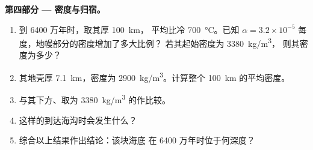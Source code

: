 \begin{problem}
\medskip
\noindent\textbf{第四部分 --- 密度与归宿。}
\begin{enumerate}[resume]
  \item 到 6400 万年时，取其厚 \qty{100}{km}，
        平均比冷 \qty{700}{\celsius}。已知
        $\alpha = 3.2 \times 10^{-5}$ 每度，地幔部分的密度增加了多大比例？
        若其起始密度为 \qty{3380}{kg/m^3}，
        则其密度为多少？
  \item 其地壳厚 \qty{7.1}{km}，密度为
        \qty{2900}{kg/m^3}。计算整个
        \qty{100}{km} 的平均密度。
  \item 与其下方、取为
        \qty{3380}{kg/m^3} 的作比较。
  \item 这样的到达海沟时会发生什么？
  \item 综合以上结果作出结论：该块海底
        在 6400 万年时位于何深度？
\end{enumerate}
\end{problem}
